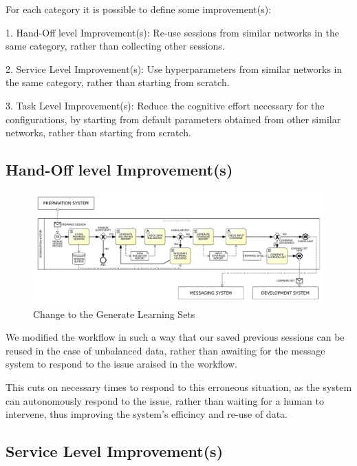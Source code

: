 For each category it is possible to define some improvement(s):

1. Hand-Off level Improvement(s): Re-use sessions from similar networks in the same category, rather than collecting other sessions.

2. Service Level Improvement(s): Use hyperparameters from similar networks in the same category, rather than starting from scratch.

3. Task Level Improvement(s): Reduce the cognitive effort necessary for the configurations, by starting from default parameters obtained from other similar networks, rather than starting from scratch.


\subsection{Hand-Off level Improvement(s)}
\label{subsec:hand_off_level_improvements}


\begin{figure}[H]
    \centering
    \includegraphics[width=1\textwidth]{figures/TO-BE Business Diagram - Generate Learning Sets.pdf}
    \caption{Change to the Generate Learning Sets}
    \label{fig:to_be_generate_learning_sets}
\end{figure}

We modified the workflow in such a way that our saved previous sessions can be reused in the case of unbalanced data, rather than awaiting for the message system to respond to the issue araised in the workflow.

This cuts on necessary times to respond to this erroneous situation, as the system can autonomously respond to the issue, rather than waiting for a human to intervene, thus improving the system's efficincy and re-use of data.



\subsection{Service Level Improvement(s)}
\label{subsec:service_level_improvements}

